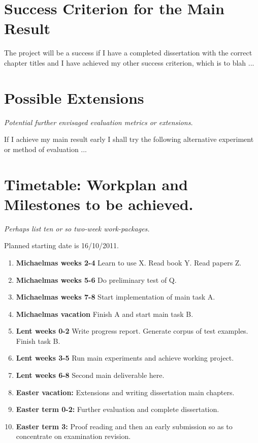 \section{Success Criterion for the Main Result}


The project will be a success if I have a completed dissertation with the correct chapter
titles and I have achieved my other success criterion, which is to blah ...



\section{Possible Extensions}

{\em Potential further envisaged evaluation metrics or extensions.}

If I achieve my main result early I shall try the following alternative experiment or method of evaluation ...


\section{Timetable: Workplan and Milestones to be achieved.}


{\em Perhaps list ten or so  two-week work-packages.}

Planned starting date is 16/10/2011.

\begin{enumerate}

\item {\bf Michaelmas weeks 2-4} Learn to use X. Read book Y. Read papers Z.

\item {\bf Michaelmas weeks 5-6} Do preliminary test of Q.

\item {\bf Michaelmas weeks 7-8} Start implementation of main task A.

\item {\bf Michaelmas vacation} Finish A and start main task B.

\item {\bf Lent weeks 0-2} Write progress report. Generate corpus of test examples. Finish task B.  

\item {\bf Lent weeks 3-5} Run main experiments and achieve working project.

\item {\bf Lent weeks 6-8} Second main deliverable here.

\item {\bf Easter vacation:} Extensions and writing dissertation main chapters.

\item {\bf Easter term 0-2:}  Further evaluation and complete dissertation.

\item {\bf Easter term 3:} Proof reading and then an early submission so as to concentrate on examination revision.

\end{enumerate}


 

